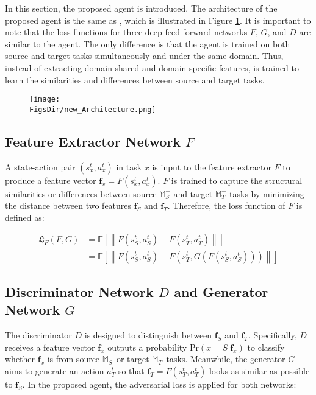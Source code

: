 In this section, the proposed \TAIL{} agent is introduced.
The architecture of the proposed agent is the same as \DAIL{}, which is illustrated in Figure \ref{ch:TAIL:fig:Architecture}.
It is important to note that the loss functions for three deep feed-forward networks $F$, $G$, and $D$ are similar to the \DAIL{} agent.
The only difference is that the \TAIL{} agent is trained on both source and target tasks simultaneously and under the same domain.
Thus, instead of extracting domain-shared and domain-specific features, \TAIL{} is trained to learn the similarities and differences between source and target tasks.

\begin{figure}[H]
  \centering
  \texttt{[image: \\FigsDir/new\_Architecture.png]}
  \caption{\label{ch:TAIL:fig:Architecture}}
\end{figure}

\subsection{Feature Extractor Network \texorpdfstring{$F$}{F}}
A state-action pair $(s^t_x, a^t_x)$ in task $x$ is  input to the feature extractor $F$ to produce a feature vector $\mathbf{f}_x=F(s^t_x, a^t_x)$.
$F$ is trained to capture the structural similarities or differences between source $\mathbb{M}^-_S$ and target $\mathbb{M}^-_T$ tasks by minimizing the distance between two features $\mathbf{f}_S$ and $\mathbf{f}_T$.
Therefore, the loss function of $F$ is defined as:

\begin{align}
  \mathfrak{L}_F (F, G) & = \mathbb{E} \left[ \left\|
    F(s^t_S, a^t_S) - F(s^t_T, a^t_T)
  \right\| \right]                                    \\
                        & = \mathbb{E} \left[ \left\|
    F(s^t_S, a^t_S) - F( s^t_T, G( F( s^t_S, a^t_S ) ) )
    \right\| \right]
\end{align}


\subsection{Discriminator Network \texorpdfstring{$D$}{D} and Generator Network \texorpdfstring{$G$}{G}}

The discriminator $D$ is designed to distinguish between $\mathbf{f}_S$ and $\mathbf{f}_T$.
Specifically,
$D$ receives a feature vector $\mathbf{f}_x$ outputs a probability $\mathrm{Pr}(x=S|\mathbf{f}_x)$ to classify whether $\mathbf{f}_x$ is from source $\mathbb{M}^-_S$ or target $\mathbb{M}^-_T$ tasks.
Meanwhile,
the generator $G$ aims to generate an action $a^t_T$ so that $\mathbf{f}_T = F(s^t_T, a^t_T)$ looks as similar as possible to $\mathbf{f}_S$.
In the proposed \DAIL{} agent,
the adversarial loss \cite{GAN_Original} is applied for both networks:

